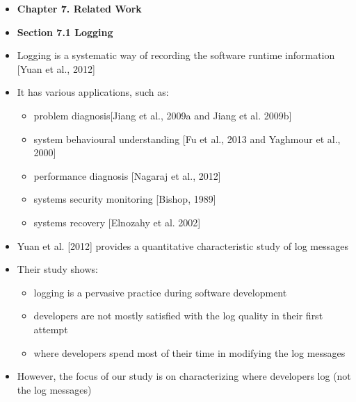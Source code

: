 \documentclass{article}
\newcommand{\bold}{\textbf}
\begin{document}
\begin{itemize} [leftmargin=.1in]
\item \bold{Chapter 7. Related Work}
\item \bold{Section 7.1 Logging}
\item Logging is a systematic way of recording the software runtime information [Yuan et al., 2012]
\item It has various applications, such as:
\begin{itemize}
\item problem diagnosis[Jiang et al., 2009a and Jiang et al. 2009b]
\item system behavioural understanding [Fu et al., 2013 and Yaghmour et al., 2000]   
\item performance diagnosis [Nagaraj et al., 2012] 
\item system\textquotesingle s security monitoring [Bishop, 1989]
\item system\textquotesingle s recovery [Elnozahy et al. 2002] 
\end{itemize}
\item Yuan et al. [2012]  provides a quantitative characteristic study of log messages
\item Their study shows: 
\begin{itemize}
\item logging is a pervasive practice during software development
\item developers are not mostly satisfied with the log quality in their first attempt
\item where developers spend most of their time in modifying the log messages
\end{itemize}
\item However, the focus of our study is on characterizing where developers log (not the log messages)


\end{itemize}
\end{document}
